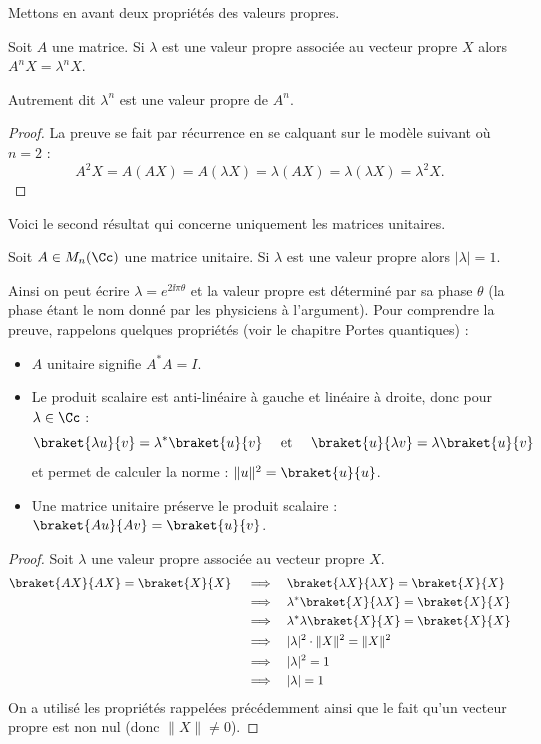 \documentclass[11pt,class=report,crop=false]{standalone}
\begin{document}
Mettons en avant deux propriétés des valeurs propres.

\begin{lemme}
\label{lem:vp1}
Soit $A$ une matrice. Si $\lambda$ est une valeur propre associée au vecteur propre $X$ alors $A^n X = \lambda^n X$.
\end{lemme}
Autrement dit $\lambda^n$ est une valeur propre de $A^n$.

\begin{proof}
La preuve se fait par récurrence en se calquant sur le modèle suivant où $n=2$ :
$$A^2 X = A (AX) = A(\lambda X) = \lambda (AX) = \lambda (\lambda X) = \lambda^2 X.$$
\end{proof}

Voici le second résultat qui concerne uniquement les matrices unitaires.
\begin{lemme}
\label{lem:vp2}
Soit $A \in M_n(\Cc)$ une matrice unitaire.
Si $\lambda$ est une valeur propre alors $|\lambda|=1$.
\end{lemme}
Ainsi on peut écrire $\lambda = e^{2\ii\pi \theta}$ et la valeur propre est déterminé par sa \og{}phase\fg{} $\theta$ (la phase étant le nom donné par les physiciens à l'argument).
Pour comprendre la preuve, rappelons quelques propriétés (voir le chapitre \og{}Portes quantiques\fg{}) :
\begin{itemize}
  \item $A$ unitaire signifie $A^* A = I$.
  \item Le produit scalaire est anti-linéaire à gauche et linéaire à droite, donc pour $\lambda\in\Cc$ :
$$\displaystyle
\braket{ \lambda u}{v} = \lambda^* \braket{u}{v}
\quad \text{ et } \quad \braket{u}{\lambda v} = \lambda \braket{u}{v}
$$
et permet de calculer la norme : $\|u\|^2 = \braket{u}{u}$.

  \item Une matrice unitaire préserve le produit scalaire :  
$\braket{Au}{Av} = \braket{u}{v}$.
\end{itemize}

\begin{proof}
Soit $\lambda$ une valeur propre associée au vecteur propre $X$.
\begin{align*}
 \braket{AX}{AX} = \braket{X}{X} 
\quad \implies  & \quad \braket{\lambda X}{\lambda X} = \braket{X}{X} \\
\quad \implies  & \quad \lambda^* \braket{X}{\lambda X} = \braket{X}{X} \\
\quad \implies  & \quad \lambda^* \lambda \braket{X}{X} = \braket{X}{X} \\
\quad \implies  & \quad |\lambda|^2 \cdot  \| X \|^2  =  \| X \|^2 \\
\quad \implies  & \quad |\lambda|^2  =  1\\
\quad \implies  & \quad |\lambda|  =  1\\
\end{align*}
On a utilisé les propriétés rappelées précédemment ainsi que le fait qu'un vecteur propre est non nul (donc $\|X\| \neq 0$).
\end{proof}
\end{document}
